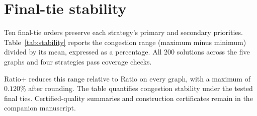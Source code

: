 \section{Final-tie stability}
\label{sec:stability}
Ten final-tie orders preserve each strategy's primary and secondary priorities. Table~\ref{tab:stability} reports the congestion range (maximum minus minimum) divided by its mean, expressed as a percentage. All 200 solutions across the five graphs and four strategies pass coverage checks.

\begin{table}[H]
\centering\tablefont\setlength{\tabcolsep}{13pt}
\caption{Congestion range across ten final-tie orders (\%). These values quantify sensitivity to final ties, rather than run-time variability.}
\label{tab:stability}

\end{table}

Ratio+ reduces this range relative to Ratio on every graph, with a maximum of $0.120\%$ after rounding. The table quantifies congestion stability under the tested final ties. Certified-quality summaries and construction certificates remain in the companion manuscript.
